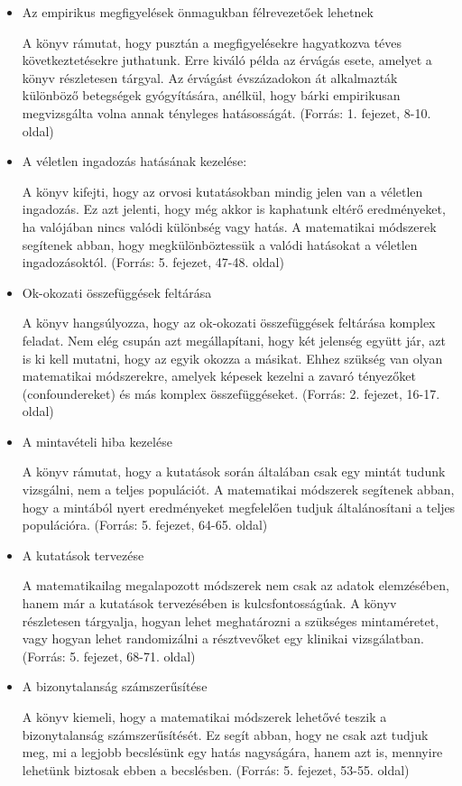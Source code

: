 \documentclass[a4paper,12pt]{article}
\begin{document}
\begin{itemize}

\item Az empirikus megfigyelések önmagukban félrevezetőek lehetnek

A könyv rámutat, hogy pusztán a megfigyelésekre hagyatkozva téves következtetésekre juthatunk. Erre kiváló példa az érvágás esete, amelyet a könyv részletesen tárgyal. Az érvágást évszázadokon át alkalmazták különböző betegségek gyógyítására, anélkül, hogy bárki empirikusan megvizsgálta volna annak tényleges hatásosságát. (Forrás: 1. fejezet, 8-10. oldal)

\item A véletlen ingadozás hatásának kezelése:

A könyv kifejti, hogy az orvosi kutatásokban mindig jelen van a véletlen ingadozás. Ez azt jelenti, hogy még akkor is kaphatunk eltérő eredményeket, ha valójában nincs valódi különbség vagy hatás. A matematikai módszerek segítenek abban, hogy megkülönböztessük a valódi hatásokat a véletlen ingadozásoktól. (Forrás: 5. fejezet, 47-48. oldal)

\item Ok-okozati összefüggések feltárása 

A könyv hangsúlyozza, hogy az ok-okozati összefüggések feltárása komplex feladat. Nem elég csupán azt megállapítani, hogy két jelenség együtt jár, azt is ki kell mutatni, hogy az egyik okozza a másikat. Ehhez szükség van olyan matematikai módszerekre, amelyek képesek kezelni a zavaró tényezőket (confoundereket) és más komplex összefüggéseket. (Forrás: 2. fejezet, 16-17. oldal)

\item A mintavételi hiba kezelése

A könyv rámutat, hogy a kutatások során általában csak egy mintát tudunk vizsgálni, nem a teljes populációt. A matematikai módszerek segítenek abban, hogy a mintából nyert eredményeket megfelelően tudjuk általánosítani a teljes populációra. (Forrás: 5. fejezet, 64-65. oldal)

\item A kutatások tervezése

A matematikailag megalapozott módszerek nem csak az adatok elemzésében, hanem már a kutatások tervezésében is kulcsfontosságúak. A könyv részletesen tárgyalja, hogyan lehet meghatározni a szükséges mintaméretet, vagy hogyan lehet randomizálni a résztvevőket egy klinikai vizsgálatban. (Forrás: 5. fejezet, 68-71. oldal)

\item A bizonytalanság számszerűsítése 

A könyv kiemeli, hogy a matematikai módszerek lehetővé teszik a bizonytalanság számszerűsítését. Ez segít abban, hogy ne csak azt tudjuk meg, mi a legjobb becslésünk egy hatás nagyságára, hanem azt is, mennyire lehetünk biztosak ebben a becslésben. (Forrás: 5. fejezet, 53-55. oldal)

\end{itemize}
\end{document}
